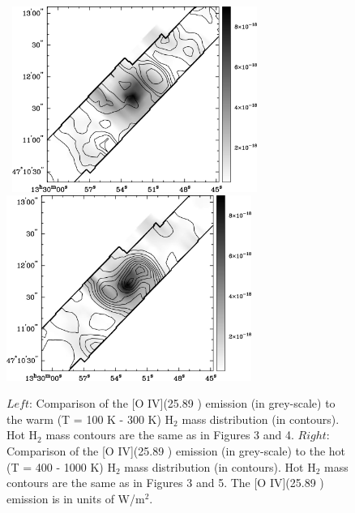 \documentclass[manuscript]{aastex}
\begin{document}
\begin{figure}[!h]
\centerline{\hbox{ \hspace{0.0in} 
\includegraphics[width=8cm,angle=0]{oiv_v_warm_paper.jpg}
\hspace{0.1in}
\includegraphics[width=8cm,angle=0]{oiv_v_hot_paper.jpg}}}
\caption{$Left$:  Comparison of the [O IV](25.89 \micron) emission (in grey-scale) to the warm (T = 100 K - 300 K) $\mathrm{H_2}$ mass distribution (in contours).  Hot $\mathrm{H_2}$ mass contours are the same as in Figures 3 and 4.  $Right$: Comparison of the [O IV](25.89 \micron) emission (in grey-scale) to the hot (T = 400 - 1000 K) $\mathrm{H_2}$ mass distribution (in contours).  Hot $\mathrm{H_2}$ mass contours are the same as in Figures 3 and 5.  The [O IV](25.89 \micron) emission is in units of W/$\mathrm{m^2}$.\label{fig11}}
\end{figure}

\clearpage
\end{document}
